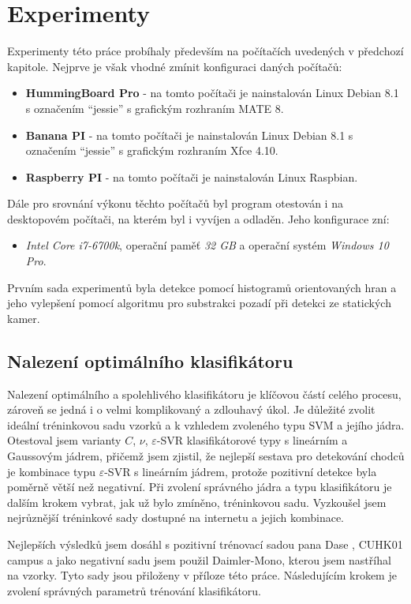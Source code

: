 \section{Experimenty}

Experimenty této práce probíhaly především na počítačích uvedených v předchozí kapitole. Nejprve je však vhodné zmínit konfiguraci daných počítačů:
\begin{itemize}
\item\textbf{HummingBoard Pro} - na tomto počítači je nainstalován Linux Debian 8.1 s označením ``jessie'' s grafickým rozhraním MATE 8.
\item\textbf{Banana PI} - na tomto počítači je nainstalován Linux Debian 8.1 s označením ``jessie'' s grafickým rozhraním Xfce 4.10. 
\item\textbf{Raspberry PI} - na tomto počítači je nainstalován Linux Raspbian. 
\end{itemize}
Dále pro srovnání výkonu těchto počítačů byl program otestován i na desktopovém počítači, na kterém byl i vyvíjen a odladěn. Jeho konfigurace zní: 
\begin{itemize}
\item\textit{Intel Core i7-6700k}, operační paměť  \textit{32 GB} a operační systém  \textit{Windows 10 Pro}.
\end{itemize}
Prvním sada experimentů byla detekce pomocí histogramů orientovaných hran a jeho vylepšení pomocí algoritmu pro substrakci pozadí při detekci ze statických kamer.

\subsection{Nalezení optimálního klasifikátoru}

Nalezení optimálního a spolehlivého klasifikátoru je klíčovou částí celého procesu, zároveň se jedná i o velmi komplikovaný a zdlouhavý úkol. Je důležité zvolit ideální tréninkovou sadu vzorků a k vzhledem zvoleného typu SVM a jejího jádra. Otestoval jsem varianty $C$, $\nu$, $\varepsilon$-SVR klasifikátorové typy s lineárním a Gaussovým jádrem, přičemž jsem zjistil, že nejlepší sestava pro detekování chodců je kombinace typu $\varepsilon$-SVR s lineárním jádrem, protože pozitivní detekce byla poměrně větší než negativní. Při zvolení správného jádra a typu klasifikátoru je dalším krokem vybrat, jak už bylo zmíněno, tréninkovou sadu. Vyzkoušel jsem nejrůznější tréninkové sady dostupné na internetu a jejich kombinace.

Nejlepších výsledků jsem dosáhl s pozitivní trénovací sadou pana Dase \cite{sudipdas}, CUHK01 campus \cite{cuhk} a jako negativní sadu jsem použil Daimler-Mono\cite{daimler}, kterou jsem nastříhal na vzorky. Tyto sady jsou přiloženy v příloze této práce. Následujícím krokem je zvolení správných parametrů trénování klasifikátoru. 

